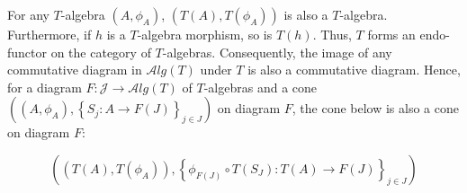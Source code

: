  
For any $T$-algebra $(A,\phi_{A})$, $(T(A),T(\phi_{A}))$ is also a $T$-algebra. Furthermore, if $h$ is a $T$-algebra morphism, so is $T(h)$. Thus, $T$ forms an endo-functor on the category of $T$-algebras. Consequently, the image of any commutative diagram in $\mathcal{A}lg(T)$ under $T$ is also a commutative diagram. Hence, for a diagram $F:\mathcal{J}\to\mathcal{A}lg(T)$ of $T$-algebras and a cone $\left((A,\phi_{A}),\left\{S_{j}:A\to F(J)\right\}_{j\in J}\right)$ on diagram $F$, the cone below is also a cone on diagram $F$:\par
    \[\left((T(A),T(\phi_{A})),\left\{\phi_{F(J)}\circ T(S_{J}):T(A)\to F(J)\right\}_{j\in J}\right)\]    
 
 
 
\par
 
 
 
 
